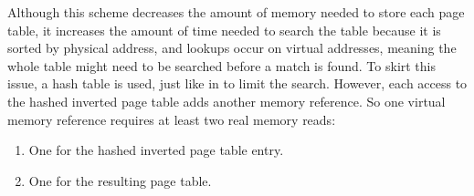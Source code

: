 Although this scheme decreases the amount of memory needed to store each page table, it increases the amount of time needed to search the table because it is sorted by physical address, and lookups occur on virtual addresses, meaning the whole table might need to be searched before a match is found.
To skirt this issue, a hash table is used, just like in  to limit the search.
However, each access to the hashed inverted page table adds another memory reference.
So one virtual memory reference requires at least two real memory reads:
\begin{enumerate}[noitemsep]
\item One for the hashed inverted page table entry.
\item One for the resulting page table.
\end{enumerate}


